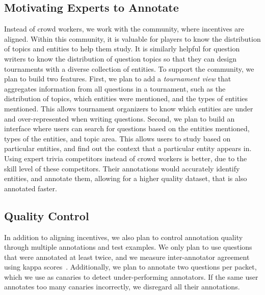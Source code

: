 \subsection{Motivating Experts to Annotate}
\label{sec:packet}
Instead of crowd workers, we work with the \qb{} community, where incentives are aligned. 
Within this community, it is valuable for players to know the distribution of topics and entities to help them study. 
It is similarly helpful for question writers to know the distribution of question topics so that they can design tournaments with a diverse collection of entities. 
To support the \qb{} community, we plan to build two features.
First, we plan to add a \emph{tournament view} that aggregates information from all questions in a tournament, such as the distribution of topics, which entities were mentioned, and the types of entities mentioned.
This allows tournament organizers to know which entities are under and over-represented when writing questions. 
Second, we plan to build an interface where users can search for questions based on the entities mentioned, types of the entities, and topic area.
This allows users to study based on particular entities, and find out the context that a particular entity appears in. 
Using expert trivia competitors instead of crowd workers is better, due to the skill level of these competitors. 
Their annotations would accurately identify entities, and annotate them, allowing for a higher quality dataset, that is also annotated faster. 

\subsection{Quality Control}
\label{sec:expert}
In addition to aligning incentives, we also plan to control annotation quality through multiple annotations and test examples.
We only plan to use questions that were annotated at least twice, and we measure inter-annotator agreement using kappa scores~\cite{mchugh2012interrater}.
Additionally, we plan to annotate two questions per packet, which we use as canaries to detect under-performing annotators.
If the same user annotates too many canaries incorrectly, we disregard all their annotations.


